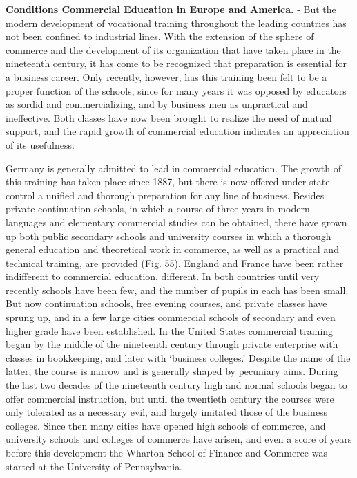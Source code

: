 \documentclass[
]{book}
\begin{document}
\textbf{Conditions Commercial Education in Europe and America.} - But the modern development of vocational training throughout the leading countries has not been confined to industrial lines. With the extension of the sphere of commerce and the development of its organization that have taken place in the nineteenth century, it has come to be recognized that preparation is essential for a business career. Only recently, however, has this training been felt to be a proper function of the schools, since for many years it was opposed by educators as sordid and commercializing, and by business men as unpractical and ineffective. Both classes have now been brought to realize the need of mutual support, and the rapid growth of commercial education indicates an appreciation of its usefulness.

Germany is generally admitted to lead in commercial education. The growth of this training has taken place since 1887, but there is now offered under state control a unified and thorough preparation for any line of business. Besides private continuation schools, in which a course of three years in modern languages and elementary commercial studies can be obtained, there have grown up both public secondary schools and university courses in which a thorough general education and theoretical work in commerce, as well as a practical and technical training, are provided (Fig. 55). England and France have been rather indifferent to commercial education, different. In both countries until very recently schools have been few, and the number of pupils in each has been small. But now continuation schools, free evening courses, and private classes have sprung up, and in a few large cities commercial schools of secondary and even higher grade have been established. In the United States commercial training began by the middle of the nineteenth century through private enterprise with classes in bookkeeping, and later with `business colleges.' Despite the name of the latter, the course is narrow and is generally shaped by pecuniary aims. During the last two decades of the nineteenth century high and normal schools began to offer commercial instruction, but until the twentieth century the courses were only tolerated as a necessary evil, and largely imitated those of the business colleges. Since then many cities have opened high schools of commerce, and university schools and colleges of commerce have arisen, and even a score of years before this development the Wharton School of Finance and Commerce was started at the University of Pennsylvania.
\end{document}
